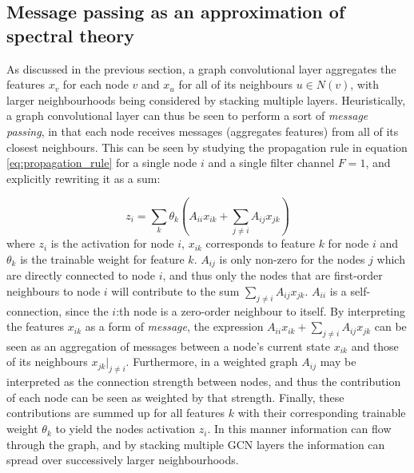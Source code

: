 \subsection{Message passing as an approximation of spectral theory}

As discussed in the previous section, a graph convolutional layer aggregates the features $x_v$ for each node $v$ and $x_u$ for all of its neighbours $u \in N(v)$, with larger neighbourhoods being considered by stacking multiple layers. Heuristically, a graph convolutional layer can thus be seen to perform a sort of \textit{message passing}, in that each node receives messages (aggregates features) from all of its closest neighbours. This can be seen by studying the propagation rule in equation \eqref{eq:propagation_rule} for a single node $i$ and a single filter channel $F=1$, and explicitly rewriting it as a sum: 

\begin{equation}
    z_i = \sum_k \theta_k \left(A_{ii} x_{ik} + \sum_{j \neq i} A_{ij} x_{jk} \right)
\end{equation}
where $z_i$ is the activation for node $i$, $x_{ik}$ corresponds to feature $k$ for node $i$ and $\theta_k$ is the trainable weight for feature $k$. $A_{ij}$ is only non-zero for the nodes $j$ which are directly connected to node $i$, and thus only the nodes that are first-order neighbours to node $i$ will contribute to the sum $\sum_{j \neq i} A_{ij} x_{jk}$. $A_{ii}$ is a self-connection, since the $i$:th node is a zero-order neighbour to itself.
By interpreting the features $x_{ik}$ as a form of \textit{message}, the expression $A_{ii} x_{ik} + \sum_{j \neq i} A_{ij} x_{jk}$ can be seen as an aggregation of messages between a node's current state $x_{ik}$ and those of its neighbours $x_{jk}\left.\right\rvert_{j\neq i}$. Furthermore, in a weighted graph $A_{ij}$ may be interpreted as the connection strength between nodes, and thus the contribution of each node can be seen as weighted by that strength. Finally, these contributions are summed up for all features $k$ with their corresponding trainable weight $\theta_k$ to yield the nodes activation $z_i$. In this manner information can flow through the graph, and by stacking multiple GCN layers the information can spread over successively larger neighbourhoods. 






